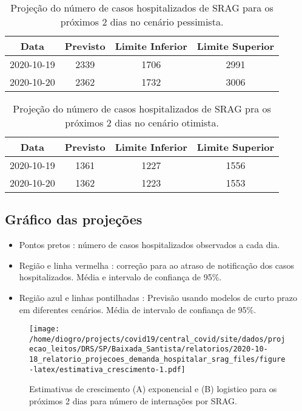 \documentclass[
]{article}
\providecommand{\tightlist}{%
  \setlength{\itemsep}{0pt}\setlength{\parskip}{0pt}}
\begin{document}
\begin{table}

\caption{\label{tab:projecoes_Exp}Projeção do número de casos hospitalizados de SRAG para os próximos 2 dias no cenário pessimista.}
\centering
\begin{tabular}[t]{c|c|c|c}
\hline
Data & Previsto & Limite Inferior & Limite Superior\\
\hline
2020-10-19 & 2339 & 1706 & 2991\\
\hline
2020-10-20 & 2362 & 1732 & 3006\\
\hline
\end{tabular}
\end{table}
\begin{table}

\caption{\label{tab:projecoes_Logist}Projeção do número de casos hospitalizados de SRAG pra os próximos 2 dias no cenário otimista.}
\centering
\begin{tabular}[t]{c|c|c|c}
\hline
Data & Previsto & Limite Inferior & Limite Superior\\
\hline
2020-10-19 & 1361 & 1227 & 1556\\
\hline
2020-10-20 & 1362 & 1223 & 1553\\
\hline
\end{tabular}
\end{table}
\newpage

\hypertarget{gruxe1fico-das-projeuxe7uxf5es}{%
\subsection{Gráfico das
projeções}\label{gruxe1fico-das-projeuxe7uxf5es}}

\begin{itemize}
\tightlist
\item
  Pontos pretos : número de casos hospitalizados observados a cada dia.
\item
  Região e linha vermelha : correção para ao atraso de notificação dos
  casos hospitalizados. Média e intervalo de confiança de 95\%.
\item
  Região azul e linhas pontilhadas : Previsão usando modelos de curto
  prazo em diferentes cenários. Média de intervalo de confiança de 95\%.
\end{itemize}

\begin{figure}
\centering
\texttt{[image: /home/diogro/projects/covid19/central\_covid/site/dados/projecao\_leitos/DRS/SP/Baixada\_Santista/relatorios/2020-10-18\_relatorio\_projecoes\_demanda\_hospitalar\_srag\_files/figure-latex/estimativa\_crescimento-1.pdf]}
\caption{Estimativas de crescimento (A) exponencial e (B) logistico para
os próximos 2 dias para número de internações por SRAG.}
\end{figure}
\end{document}
